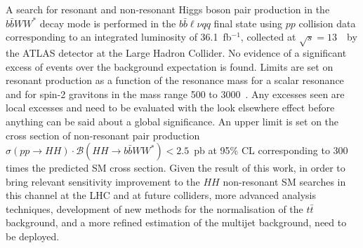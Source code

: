 A search for  resonant and non-resonant Higgs boson pair production in
the $b\bar{b}WW^\ast$ decay mode is performed in the $b\bar{b}\ell\nu qq$
final state using $pp$ collision data corresponding to an integrated
luminosity of 36.1~fb$^{-1}$, collected at $\sqrt{s}=13$~\TeV\ by the
ATLAS detector at the Large Hadron Collider. No evidence of a  significant excess of events
over the background expectation is found.
Limits are set on resonant production as a function of the resonance mass for a scalar resonance and for
spin-2 gravitons in the mass range 500 to 3000~\GeV. Any excesses seen are local excesses and need to be evaluated with the look elsewhere effect before anything can be said about a global significance.
An upper limit is set on the cross section of non-resonant pair production
$\sigma(pp \to HH) \cdot {\mathcal{B}}(HH \to b\bar{b}WW^{\ast}) < 2.5$~pb
at 95\% CL corresponding to  300 times the predicted SM cross
section. Given the result of this work, in order to bring
relevant sensitivity improvement to the $HH$ non-resonant SM searches
in this channel at the LHC and at future colliders, more advanced analysis techniques,
development of new methods for the normalisation of the $t\bar{t}$
background, and a more refined estimation of the multijet background, need to be deployed.
 
 
 